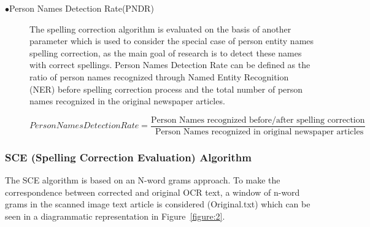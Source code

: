 \documentclass[letterpaper,11pt]{report}
\begin{document}
\begin{description}
\item[$\bullet$Person Names Detection Rate(PNDR)]

The spelling correction algorithm is evaluated on the basis of another parameter which is used to consider the special case of person entity names spelling correction, as the main goal of research is to detect these names with correct spellings.
Person Names Detection Rate can be defined as the ratio of person names recognized through Named Entity Recognition (NER) before spelling correction process and the total number of person names recognized in the original newspaper articles.

$$Person Names Detection Rate=\dfrac{ \text{Person Names recognized before/after spelling correction}} {\text{ Person Names recognized in original newspaper articles}} $$

\end{description}

\subsubsection{SCE (Spelling Correction Evaluation) Algorithm}

The SCE algorithm is based on an N-word grams approach. To make the correspondence between corrected and original OCR text, a window of n-word grams in the scanned image text article is considered (Original.txt) which can be seen in a diagrammatic representation in Figure~\ref{figure:2}.
\end{document}
